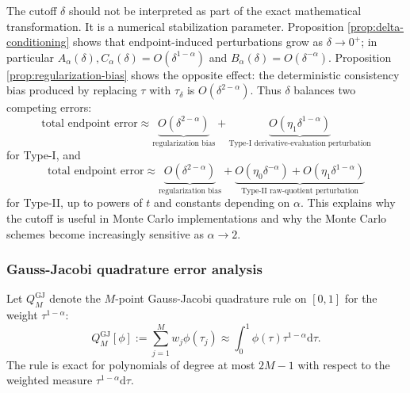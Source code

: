 \documentclass[preprint,3p,times]{elsarticle}
\def\d{\mathrm{d}}
\begin{document}
\begin{remark}
\label{rem:delta-tradeoff}
The cutoff $\delta$ should not be interpreted as part of the exact mathematical transformation. It is a numerical stabilization parameter. Proposition \ref{prop:delta-conditioning} shows that endpoint-induced perturbations grow as $\delta\to0^+$; in particular $A_\alpha(\delta),C_\alpha(\delta)=O(\delta^{1-\alpha})$ and $B_\alpha(\delta)=O(\delta^{-\alpha})$. Proposition \ref{prop:regularization-bias} shows the opposite effect: the deterministic consistency bias produced by replacing $\tau$ with $\tau_\delta$ is $O(\delta^{2-\alpha})$. Thus $\delta$ balances two competing errors:
\begin{equation}\label{eqn:delta-tradeoff-summary}
    \text{total endpoint error}
    \approx
    \underbrace{O(\delta^{2-\alpha})}_{\text{regularization bias}}
    +
    \underbrace{O(\eta_1\delta^{1-\alpha})}_{\text{Type-I derivative-evaluation perturbation}}
\end{equation}
for Type-I, and
\begin{equation}\label{eqn:delta-tradeoff-summary-II}
    \text{total endpoint error}
    \approx
    \underbrace{O(\delta^{2-\alpha})}_{\text{regularization bias}}
    +
    \underbrace{O(\eta_0\delta^{-\alpha})+O(\eta_1\delta^{1-\alpha})}_{\text{Type-II raw-quotient perturbation}}
\end{equation}
for Type-II, up to powers of $t$ and constants depending on $\alpha$. This explains why the cutoff is useful in Monte Carlo implementations and why the Monte Carlo schemes become increasingly sensitive as $\alpha\to2$.
\end{remark}

\subsubsection{Gauss-Jacobi quadrature error analysis}

Let $Q_M^{\mathrm{GJ}}$ denote the $M$-point Gauss-Jacobi quadrature rule on $[0,1]$ for the weight $\tau^{1-\alpha}$:
\begin{equation}\label{eqn:GJ-def}
    Q_M^{\mathrm{GJ}}[\phi]:=\sum_{j=1}^M w_j\phi(\tau_j)
    \approx \int_0^1\phi(\tau)\tau^{1-\alpha}\d\tau .
\end{equation}
The rule is exact for polynomials of degree at most $2M-1$ with respect to the weighted measure $\tau^{1-\alpha}\d\tau$.
\end{document}
